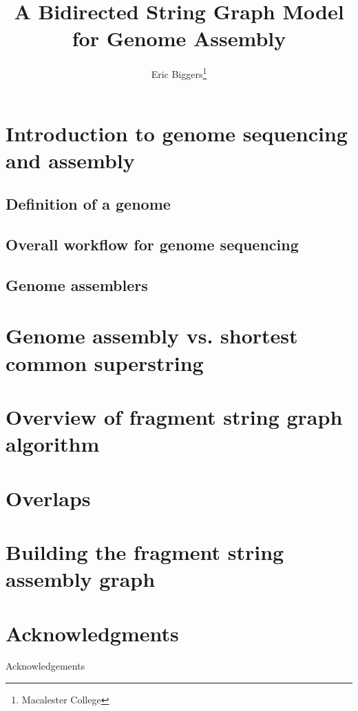 \documentclass[10pt]{article}
\title{A Bidirected String Graph Model for Genome Assembly}
\author{Eric Biggers\footnote{Macalester College}}
\begin{document}
\maketitle


\section{Introduction to genome sequencing and assembly}

\subsection{Definition of a genome}
\subsection{Overall workflow for genome sequencing}
\subsection{Genome assemblers}

\section{Genome assembly vs. shortest common superstring}

\section{Overview of fragment string graph algorithm}

\section{Overlaps}

\section{Building the fragment string assembly graph}


\section*{Acknowledgments}

Acknowledgements



\end{document}

